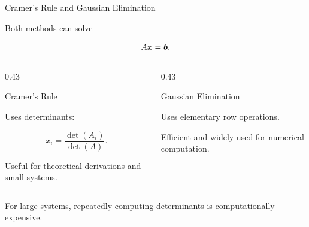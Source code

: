 \begin{frame}{Cramer's Rule and Gaussian Elimination}

Both methods can solve

\[
A\bm{x}=\bm{b}.
\]

\vspace{0.4cm}

\begin{columns}[T,totalwidth=\textwidth]

\begin{column}{0.43\textwidth}

\begin{block}{Cramer's Rule}

Uses determinants:

\[
x_i=
\frac{\det(A_i)}{\det(A)}.
\]

Useful for theoretical derivations and small systems.

\end{block}

\end{column}

\begin{column}{0.43\textwidth}

\begin{block}{Gaussian Elimination}

Uses elementary row operations.

Efficient and widely used for numerical computation.

\end{block}

\end{column}

\end{columns}

\vspace{0.4cm}

For large systems, repeatedly computing determinants is
computationally expensive.

\end{frame}



